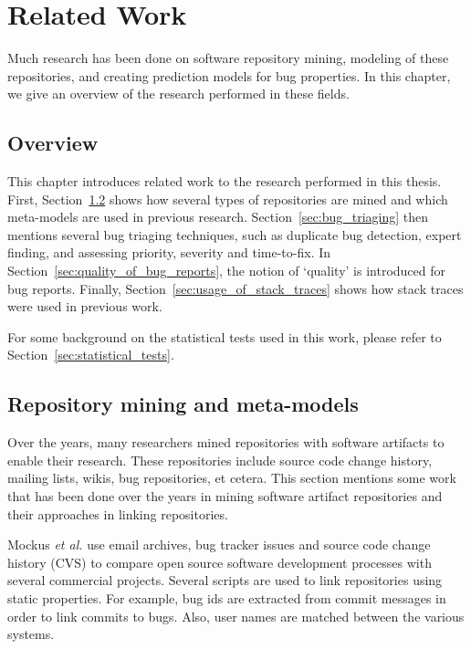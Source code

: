 
\chapter{Related Work} %
\label{cha:related_work}

Much research has been done on software repository mining, modeling of these repositories, and creating prediction models for bug properties. In this chapter, we give an overview of the research performed in these fields.

\section{Overview} %
This chapter introduces related work to the research performed in this thesis. First, Section~\ref{sec:repository_mining_and_meta_models} shows how several types of repositories are mined and which meta-models are used in previous research. Section~\ref{sec:bug_triaging} then mentions several bug triaging techniques, such as duplicate bug detection, expert finding, and assessing priority, severity and time-to-fix. In Section~\ref{sec:quality_of_bug_reports}, the notion of `quality' is introduced for bug reports. Finally, Section~\ref{sec:usage_of_stack_traces} shows how stack traces were used in previous work.

For some background on the statistical tests used in this work, please refer to Section~\ref{sec:statistical_tests}.

\section{Repository mining and meta-models}
\label{sec:repository_mining_and_meta_models}
Over the years, many researchers mined repositories with software artifacts to enable their research. These repositories include source code change history, mailing lists, wikis, bug repositories, et cetera. This section mentions some work that has been done over the years in mining software artifact repositories and their approaches in linking repositories.

Mockus \emph{et al.} \cite{Mockus2002} use email archives, bug tracker issues and source code change history (CVS) to compare open source software development processes with several commercial projects. Several scripts are used to link repositories using static properties. For example, bug ids are extracted from commit messages in order to link commits to bugs. Also, user names are matched between the various systems.

